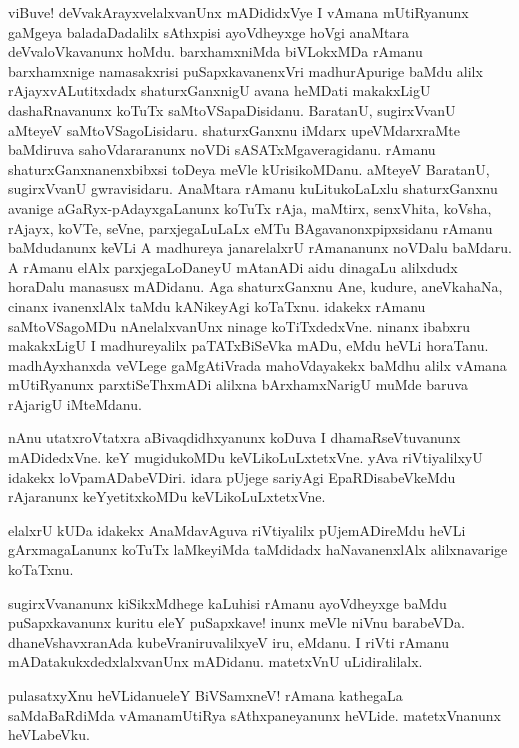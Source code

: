 \begin{mng}
viBuve! deVvakArayxvelalxvanUnx mADididxVye I vAmana mUtiRyanunx gaMgeya baladaDadalilx sAthxpisi ayoVdheyxge hoVgi anaMtara deVvaloVkavanunx hoMdu. barxhamxniMda biVLokxMDa rAmanu barxhamxnige namasakxrisi puSapxkavanenxVri madhurApurige baMdu alilx rAjayxvALutitxdadx shaturxGanxnigU avana heMDati makakxLigU dashaRnavanunx koTuTx saMtoVSapaDisidanu. BaratanU, sugirxVvanU aMteyeV saMtoVSagoLisidaru. shaturxGanxnu iMdarx upeVMdarxraMte baMdiruva sahoVdararanunx noVDi sASATxMgaveragidanu. rAmanu shaturxGanxnanenxbibxsi toDeya meVle kUrisikoMDanu. aMteyeV BaratanU, sugirxVvanU gwravisidaru. AnaMtara rAmanu kuLitukoLaLxlu shaturxGanxnu avanige aGaRyx-pAdayxgaLanunx koTuTx rAja, maMtirx, senxVhita, koVsha, rAjayx, koVTe, seVne, parxjegaLuLaLx eMTu BAgavanonxpipxsidanu rAmanu baMdudanunx keVLi A madhureya janarelalxrU rAmananunx noVDalu baMdaru. A rAmanu elAlx parxjegaLoDaneyU mAtanADi aidu dinagaLu alilxdudx horaDalu manasusx mADidanu. Aga shaturxGanxnu Ane, kudure, aneVkahaNa, cinanx ivanenxlAlx taMdu kANikeyAgi koTaTxnu. idakekx rAmanu saMtoVSagoMDu nAnelalxvanUnx ninage koTiTxdedxVne. ninanx ibabxru makakxLigU I madhureyalilx paTATxBiSeVka mADu, eMdu heVLi horaTanu. madhAyxhanxda veVLege gaMgAtiVrada mahoVdayakekx baMdhu alilx vAmana mUtiRyanunx parxtiSeThxmADi alilxna bArxhamxNarigU muMde baruva rAjarigU iMteMdanu.
\end{mng}

\begin{mng}
nAnu utatxroVtatxra aBivaqdidhxyanunx koDuva I dhamaRseVtuvanunx mADidedxVne. keY mugidukoMDu keVLikoLuLxtetxVne. yAva riVtiyalilxyU idakekx loVpamADabeVDiri. idara pUjege sariyAgi EpaRDisabeVkeMdu rAjaranunx keYyetitxkoMDu keVLikoLuLxtetxVne.
\end{mng}

\begin{mng}
elalxrU kUDa idakekx AnaMdavAguva riVtiyalilx pUjemADireMdu heVLi gArxmagaLanunx koTuTx laMkeyiMda taMdidadx haNavanenxlAlx alilxnavarige koTaTxnu.
\end{mng}

\begin{mng}
sugirxVvananunx kiSikxMdhege kaLuhisi rAmanu ayoVdheyxge baMdu puSapxkavanunx kuritu eleY puSapxkave! inunx meVle niVnu barabeVDa. dhaneVshavxranAda kubeVraniruvalilxyeV iru, eMdanu. I riVti rAmanu mADatakukxdedxlalxvanUnx mADidanu. matetxVnU uLidiralilalx.
\end{mng}

\begin{mng}
pulasatxyXnu heVLidanu\mdash eleY BiVSamxneV! rAmana kathegaLa saMdaBaRdiMda vAmanamUtiRya sAthxpaneyanunx heVLide. matetxVnanunx heVLabeVku.
\end{mng}

